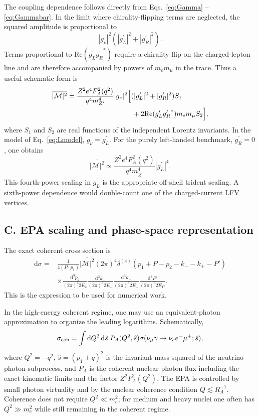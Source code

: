 \documentclass[
  aps,
  prl,
  twocolumn,
  superscriptaddress,
  amsmath, amssymb,
  floatfix, nofootinbib,
  longbibliography,
]{revtex4-2}
\newcommand{\Zp}{Z^{\prime}}
\newcommand{\mZp}{m_{\Zp}}
\newcommand{\mmu}{m_\mu}
\newcommand{\me}{m_e}
\newcommand{\gL}{{g^{\prime}_L}}
\newcommand{\gR}{{g^{\prime}_R}}
\newcommand{\gnu}{{g_\nu}}
\newcommand{\dd}{\mathrm{d}}
\begin{document}
The coupling dependence follows directly from Eqs.~\eqref{eq:Gamma}
--\eqref{eq:Gammabar}.  In the limit where chirality-flipping terms are
neglected, the squared amplitude is proportional to
\begin{equation}
  |\gnu|^2\left(|\gL|^2+|\gR|^2\right).
\label{eq:coupling-structure}
\end{equation}
Terms proportional to $\mathrm{Re}(\gL\gR^*)$ require a chirality flip
on the charged-lepton line and are therefore accompanied by powers of
$\me\mmu$ in the trace.  Thus a useful schematic form is
\begin{align}
  \overline{|\mathcal M|^2}
  ={}&
  \frac{Z^2e^4F_A^2(q^2)}{q^4\mZp^4}
  |\gnu|^2
  \Big[
  (|\gL|^2+|\gR|^2)S_1
  \nonumber\\
  &\hspace{2.8cm}
  +2\mathrm{Re}(\gL\gR^*)\me\mmu S_2
  \Big],
\label{eq:M2-schematic}
\end{align}
where $S_1$ and $S_2$ are real functions of the independent Lorentz
invariants.  In the model of Eq.~\eqref{eq:Lmodel}, $\gnu=\gL$.
For the purely left-handed benchmark, $\gR=0$, one obtains
\begin{equation}
  \overline{|\mathcal M|^2}
  \propto
  \frac{Z^2e^4F_A^2(q^2)}{q^4\mZp^4}
  |\gL|^4.
\label{eq:M2-left-scaling}
\end{equation}
This fourth-power scaling in $\gL$ is the appropriate off-shell
trident scaling.  A sixth-power dependence would double-count one of
the charged-current LFV vertices.

\subsection*{C. EPA scaling and phase-space representation}

The exact coherent cross section is
\begin{align}
  \dd\sigma
  ={}&
  \frac{1}{4(P\cdot p_1)}
  \overline{|\mathcal M|^2}
  (2\pi)^4\delta^{(4)}
  (p_1+P-p_2-k_- -k_+ -P')
  \nonumber\\
  &\times
  \frac{\dd^3p_2}{(2\pi)^3 2E_2}
  \frac{\dd^3k_-}{(2\pi)^3 2E_-}
  \frac{\dd^3k_+}{(2\pi)^3 2E_+}
  \frac{\dd^3P'}{(2\pi)^3 2E_{P'}}.
\label{eq:exact-phase-space}
\end{align}
This is the expression to be used for numerical work.

In the high-energy coherent regime, one may use an equivalent-photon
approximation to organize the leading logarithms.  Schematically,
\begin{equation}
  \sigma_{\rm coh}
  =
  \int \dd Q^2\,\dd\hat s\;
  P_A(Q^2,\hat s)
  \sigma(\nu_\mu\gamma\to\nu_e e^-\mu^+;\hat s),
\label{eq:epa-master-corrected}
\end{equation}
where $Q^2=-q^2$, $\hat s=(p_1+q)^2$ is the invariant mass squared of
the neutrino--photon subprocess, and $P_A$ is the coherent nuclear
photon flux including the exact kinematic limits and the factor
$Z^2F_A^2(Q^2)$.  The EPA is controlled by small photon virtuality and
by the nuclear coherence condition $Q\lesssim R_A^{-1}$.  Coherence
does not require $Q^2\ll\me^2$; for medium and heavy nuclei one often
has $Q^2\gg\me^2$ while still remaining in the coherent regime.
\end{document}
